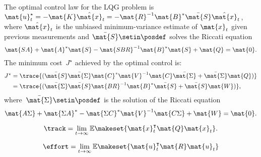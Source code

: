 {\begin{forslides}
        \begin{lemma}
            \label{lem:lqgstandard}
            The optimal control law for the LQG problem is~$\mat{u}_t^\star =-\mat{K}\hat{\mat{x}}_t=-\mat{R}^{-1}\mat{B}^*\bar{\mat{S}}\hat{\mat{x}}_t$, where $\hat{\mat{x}}_t$ is the unbiased minimum-variance estimate of $\mat{x}_t$ given previous measurements and $\bar{\mat{S}}\setin \posdef$ solves the Riccati equation
            \begin{equation}
                \label{eq:cont_ric_1}
                \mat{SA}+\mat{A}^*\mat{S}-\mat{SBR}^{-1}\mat{B}^*\mat{S}+\mat{Q}=\mat{0}.
            \end{equation}
            The minimum cost~$J^\star$ achieved by the optimal control is:
            \begin{equation}
                \label{eq:contmincost}
                \begin{aligned}
                    J^\star & =\trace{(\bar{\mat{S}}\bar{\mat{\Sigma}}\mat{C}^*\mat{V}^{-1}\mat{C}\bar{\mat{\Sigma}}+\bar{\mat{\Sigma}}\mat{Q})} \\
                            & =\trace{(\bar{\mat{\Sigma}}\bar{\mat{S}}\mat{BR}^{-1}\mat{B}^*\bar{\mat{S}}+\bar{\mat{S}}\mat{W})},
                \end{aligned}
            \end{equation}
            where~$\bar{\mat{\Sigma}}\setin \posdef$ is the solution of the Riccati equation
            \begin{equation}
                \label{eq:cont_ric_2}
                \mat{A\Sigma} + \mat{\Sigma A}^*-\mat{\Sigma C}^*\mat{V}^{-1}\mat{C\Sigma}+\mat{W}=\mat{0}.
            \end{equation}
        \end{lemma}

        \begin{equation}
            \label{eq:ptrack}
            \track=\lim_{t\to \infty}\mathbb{E}\makeset{\mat{x}_t^\intercal \mat{Q}\mat{x}_t}.
        \end{equation}

        \begin{equation}
            \label{eq:peffort}
            \effort=\lim_{t\to \infty}\mathbb{E}\makeset{\mat{u}_t^\intercal \mat{R} \mat{u}_t }
        \end{equation}


\end{forslides}}
